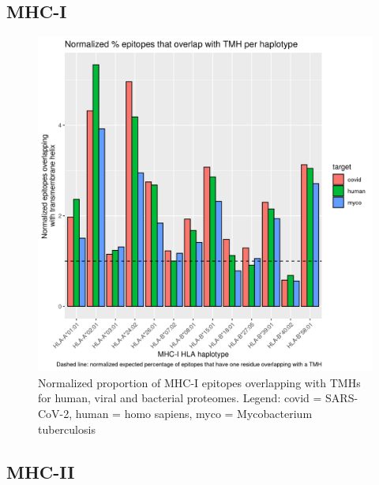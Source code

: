 \subsection{MHC-I}

\begin{figure}[!htbp]
  \includegraphics[width=\textwidth]{bbbq_1_smart_results/fig_f_tmh_mhc1_2_normalized.png}
  \caption{
    Normalized proportion of MHC-I epitopes overlapping with TMHs
    for human, viral and bacterial proteomes.
    Legend: covid = SARS-CoV-2,
    human = homo sapiens, myco = Mycobacterium tuberculosis
  }
  \label{fig:f_tmh_mhc1_normalized}
\end{figure}



\subsection{MHC-II}

